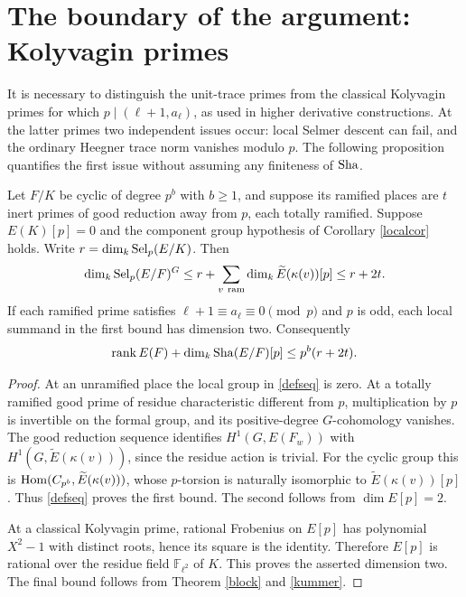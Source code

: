 \documentclass[11pt,a4paper]{article}
\numberwithin{equation}{section}
\begin{document}
\section{The boundary of the argument: Kolyvagin primes}\label{boundary}
It is necessary to distinguish the unit-trace primes from the classical Kolyvagin primes for which $p\mid(\ell+1,a_\ell)$, as used in higher derivative constructions. At the latter primes two independent issues occur: local Selmer descent can fail, and the ordinary Heegner trace norm vanishes modulo $p$. The following proposition quantifies the first issue without assuming any finiteness of $\operatorname{Sha}$.
\begin{proposition}\label{defect}
Let $F/K$ be cyclic of degree $p^b$ with $b\ge1$, and suppose its ramified places are $t$ inert primes of good reduction away from $p$, each totally ramified. Suppose $E(K)[p]=0$ and the component group hypothesis of Corollary \ref{localcor} holds. Write $r=\dim_k\operatorname{Sel}_p(E/K)$. Then
\begin{equation}\label{defbound}
\dim_k\operatorname{Sel}_p(E/F)^G\le r+\sum_{v\ \mathrm{ram}}\dim_k\widetilde E(\kappa(v))[p]
\le r+2t.
\end{equation}
If each ramified prime satisfies $\ell+1\equiv a_\ell\equiv0\pmod p$ and $p$ is odd, each local summand in the first bound has dimension two. Consequently
\[ \operatorname{rank} E(F)+\dim_k\operatorname{Sha}(E/F)[p]\le p^b(r+2t). \]
\end{proposition}
\begin{proof}
At an unramified place the local group in \eqref{defseq} is zero. At a totally ramified good prime of residue characteristic different from $p$, multiplication by $p$ is invertible on the formal group, and its positive-degree $G$-cohomology vanishes. The good reduction sequence identifies $H^1(G,E(F_w))$ with $H^1(G,\widetilde E(\kappa(v)))$, since the residue action is trivial. For the cyclic group this is $\operatorname{Hom}(C_{p^b},\widetilde E(\kappa(v)))$, whose $p$-torsion is naturally isomorphic to $\widetilde E(\kappa(v))[p]$. Thus \eqref{defseq} proves the first bound. The second follows from $\dim E[p]=2$.

At a classical Kolyvagin prime, rational Frobenius on $E[p]$ has polynomial $X^2-1$ with distinct roots, hence its square is the identity. Therefore $E[p]$ is rational over the residue field $\mathbb F_{\ell^2}$ of $K$. This proves the asserted dimension two. The final bound follows from Theorem \ref{block} and \eqref{kummer}.
\end{proof}
\end{document}
